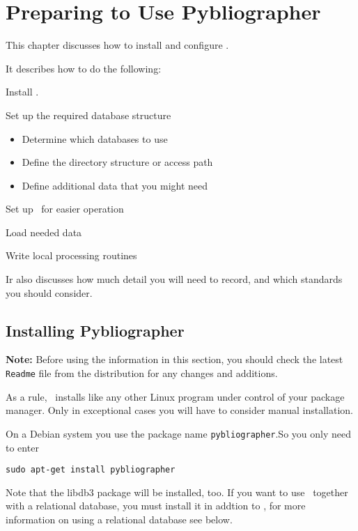 
\chapter{Preparing to Use Pybliographer}
\label{cha:rgprep}

This chapter discusses how to install and configure \Pyb.


It  describes how to do the following:

\begin{enumerate*}
\item Install \Pyb.
\item Set up the required database structure
  \begin{itemize}
  \item Determine which databases to use
  \item Define the directory structure or access path
  \item Define additional data that you might need
  \end{itemize}
\item Set up \Pyb\ for easier operation
\item Load needed data
\item Write local processing routines
\end{enumerate*}

Ir also discusses how much detail you will need to record, and which
standards you should consider.




\section{Installing Pybliographer}
\label{sec:rginstall}

\textbf{Note:} Before using the information in this section, you
should check the latest \texttt{Readme} file from the distribution for
any changes and additions.

As a rule, \Pyb\ installs like any other Linux program under control
of your package manager. Only in exceptional cases you will have to
consider manual installation. 

On a Debian system you use the package name \texttt{pybliographer}.So
you only need to enter
\begin{verbatim}
sudo apt-get install pybliographer
\end{verbatim}

Note that the libdb3 package will be installed, too. If you want to use
\Pyb\ together with a relational database, you must install it in
addtion to \Pyb, for more information on  using a relational
database see below. 

